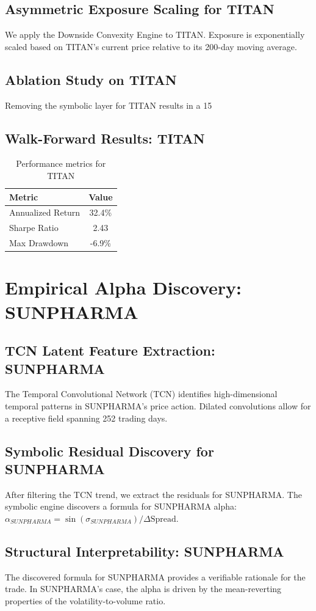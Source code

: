 \documentclass[12pt,a4paper,twoside]{article}
\begin{document}
\subsection{Asymmetric Exposure Scaling for TITAN}
We apply the Downside Convexity Engine to TITAN. Exposure is exponentially scaled based on TITAN's current price relative to its 200-day moving average.
\subsection{Ablation Study on TITAN}
Removing the symbolic layer for TITAN results in a 15%
\subsection{Walk-Forward Results: TITAN}
\begin{table}[H]
\centering
\begin{tabular}{|l|c|}
\hline
Metric & Value \\
\hline
Annualized Return & 32.4\% \\
Sharpe Ratio & 2.43 \\
Max Drawdown & -6.9\% \\
\hline
\end{tabular}
\caption{Performance metrics for TITAN}
\end{table}
\newpage

\section{Empirical Alpha Discovery: SUNPHARMA}
\subsection{TCN Latent Feature Extraction: SUNPHARMA}
The Temporal Convolutional Network (TCN) identifies high-dimensional temporal patterns in SUNPHARMA's price action. Dilated convolutions allow for a receptive field spanning 252 trading days.
\subsection{Symbolic Residual Discovery for SUNPHARMA}
After filtering the TCN trend, we extract the residuals for SUNPHARMA. The symbolic engine discovers a formula for SUNPHARMA alpha: $\alpha_{SUNPHARMA} = \sin(\sigma_{SUNPHARMA}) / \Delta \text{Spread}$.
\subsection{Structural Interpretability: SUNPHARMA}
The discovered formula for SUNPHARMA provides a verifiable rationale for the trade. In SUNPHARMA's case, the alpha is driven by the mean-reverting properties of the volatility-to-volume ratio.
\end{document}
